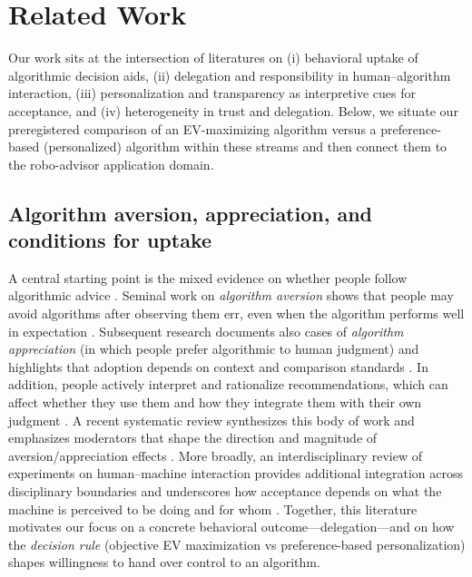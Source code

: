 \documentclass[a4paper, 12pt, fleqn]{article}
\theoremstyle{definition}
\begin{document}
\section{Related Work}
\label{sec:related}

Our work sits at the intersection of literatures on (i) behavioral uptake of algorithmic decision aids, (ii) delegation and responsibility in human--algorithm interaction, (iii) personalization and transparency as interpretive cues for acceptance, and (iv) heterogeneity in trust and delegation. Below, we situate our preregistered comparison of an EV-maximizing algorithm versus a preference-based (personalized) algorithm within these streams and then connect them to the robo-advisor application domain.

\subsection{Algorithm aversion, appreciation, and conditions for uptake}
A central starting point is the mixed evidence on whether people follow algorithmic advice \citep{Dietvorst2018,Logg2019}. Seminal work on \emph{algorithm aversion} shows that people may avoid algorithms after observing them err, even when the algorithm performs well in expectation \citep{Dietvorst2018}. Subsequent research documents also cases of \emph{algorithm appreciation} (in which people prefer algorithmic to human judgment) and highlights that adoption depends on context and comparison standards \citep{Logg2019}. In addition, people actively interpret and rationalize recommendations, which can affect whether they use them and how they integrate them with their own judgment \citep{Yeomans2019}. A recent systematic review synthesizes this body of work and emphasizes moderators that shape the direction and magnitude of aversion/appreciation effects \citep{Mahmud2022}. More broadly, an interdisciplinary review of experiments on human--machine interaction provides additional integration across disciplinary boundaries and underscores how acceptance depends on what the machine is perceived to be doing and for whom \citep{Chugunova2022}. 
Together, this literature motivates our focus on a concrete behavioral outcome---delegation---and on how the \emph{decision rule} (objective EV maximization vs preference-based personalization) shapes willingness to hand over control to an algorithm.
\end{document}
